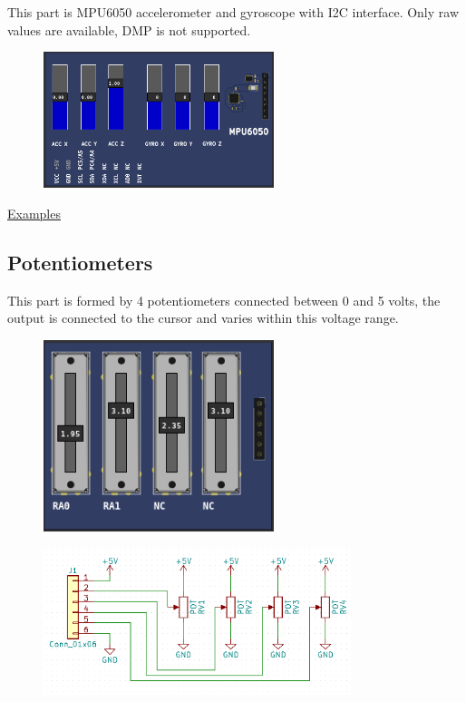 This part is MPU6050 accelerometer and gyroscope with I2C interface. 
Only raw values are available, DMP is not supported.

\begin{figure}[H]
\center
\includegraphics[width=0.6\textwidth]{img/part_mpu6050.png} 
\end{figure} 


\href{https://lcgamboa.github.io/picsimlab_examples/parts_MPU6050.html}{Examples}

\vspace{0.5cm}

\subsection{Potentiometers}

This part is formed by 4 potentiometers connected between 0 and 5 volts, the output is connected to the cursor and varies within this voltage range.
\begin{figure}[H]
\center
\includegraphics[width=0.6\textwidth]{img/part_pot.png} 
\end{figure} 

\begin{figure}[H]
\center
\includegraphics[width=0.8\textwidth]{img/part_pot_.png} 
\end{figure} 


